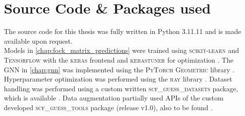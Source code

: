 \section{Source Code \& Packages used}
\label{sec:source_code_packages}
The source code for this thesis was fully written in Python 3.11.11 \parencite{ref:python} and is made available upon request.\\

Models in \autoref{chap:fock_matrix_predictions} were trained using \textsc{scikit-learn} \parencite{ref:sk-learn} and \textsc{Tensorflow} \parencite{ref:tensorflow} with the \textsc{keras} frontend \parencite{ref:keras} and \textsc{kerastuner} for optimization \parencite{ref:kerastuner}. The GNN in \autoref{chap:gnn} was implemented using the \textsc{PyTorch Geometric} library \parencite{ref:PyTorchGeometric}. Hyperparameter optimization was performed using the \textsc{ray} library \parencite{ref:ray_tune}. Dataset handling was performed using a custom written \textsc{scf\_guess\_datasets} package, which is available  \parencite{ref:milacher_scf_guess_datasets}. Data augmentation partially used APIs of the custom developed \textsc{scf\_guess\_tools} package (release v1.0), also to be found  \parencite{ref:scf_guess_tools}. 